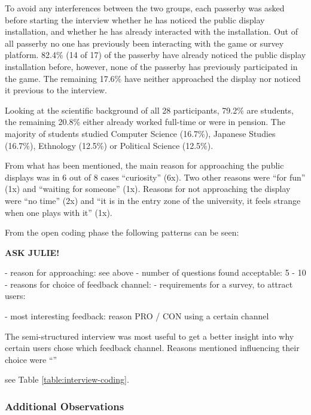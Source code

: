 	To avoid any interferences between the two groups, each passerby was asked before starting the interview whether he has noticed the public display installation, and whether he has already interacted with the installation. Out of all passerby no one has previously been interacting with the game or survey platform. 82.4\% (14 of 17) of the passerby have already noticed the public display installation before, however, none of the passerby has previously participated in the game. The remaining 17.6\% have neither approached the display nor noticed it previous to the interview. 

	Looking at the scientific background of all 28 participants, 79.2\% are students, the remaining 20.8\% either already worked full-time or were in pension. The majority of students studied Computer Science (16.7\%), Japanese Studies (16.7\%), Ethnology (12.5\%) or Political Science (12.5\%).

	From what has been mentioned, the main reason for approaching the public displays was in 6 out of 8 cases ``curiosity'' (6x). Two other reasons were ``for fun'' (1x) and ``waiting for someone'' (1x). Reasons for not approaching the display were ``no time'' (2x) and ``it is in the entry zone of the university, it feels strange when one plays with it'' (1x).

	From the open coding phase the following patterns can be seen: 

		\textbf{ASK JULIE!}

		- reason for approaching: see above
		- number of questions found acceptable: 5 - 10
		- reasons for choice of feedback channel: 
		- requirements for a survey, to attract users: 

		- most interesting feedback: reason PRO / CON using a certain channel

	The semi-structured interview was most useful to get a better insight into why certain users chose which feedback channel. Reasons mentioned influencing their choice were ``''
	
	see Table \ref{table:interview-coding}.

	






	\subsubsection{Additional Observations}

